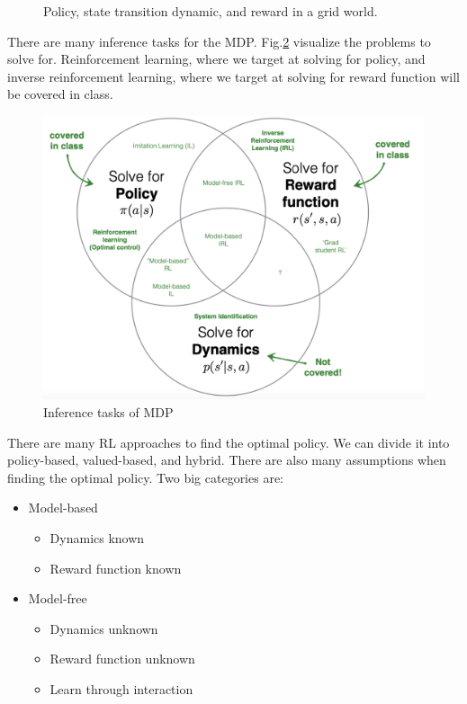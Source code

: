 \documentclass[11pt]{article}
\begin{document}
\begin{figure}[H]
\begin{subfigure}{0.3\linewidth}
     \end{subfigure}%
    \caption{Policy, state transition dynamic, and reward in a grid world.}
    \label{fig:grid_world_policy}
\end{figure}

There are many inference tasks for the MDP. Fig.\ref{fig:MDP_tasks} visualize the problems to solve for. Reinforcement learning, where we target at solving for policy, and inverse reinforcement learning, where we target at solving for reward function will be covered in class.

\begin{figure}[H]
    \centering
    \includegraphics[width=.45\linewidth]{images/MDP_tasks.png}
    \caption{Inference tasks of MDP}
    \label{fig:MDP_tasks}
\end{figure}
There are many RL approaches to find the optimal policy. We can divide it into policy-based, valued-based, and hybrid. There are also many assumptions when finding the optimal policy. Two big categories are:
\begin{itemize}
    \item Model-based
    \begin{itemize}
        \item Dynamics known
        \item Reward function known
    \end{itemize}
    \item Model-free
    \begin{itemize}
        \item Dynamics unknown
        \item Reward function unknown
        \item Learn through interaction
    \end{itemize}
\end{itemize}
\end{document}
